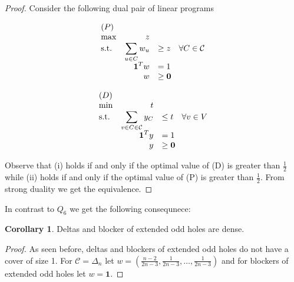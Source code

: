\documentclass[a4paper, 12pt, twoside=false]{scrbook}
\theoremstyle{definition}
\newtheorem{corollary}{Corollary}
\begin{document}
\begin{proof}
    Consider the following dual pair of linear programs
    \newline
    \newline
    \begin{minipage}{.5\linewidth}
        \begin{equation*}
            \begin{array}{l@{\quad} r l l}
                (P)\\
                \max          &z   \\
                \mathrm{s.t.}  &\displaystyle\sum\limits_{u\in C} w_u &\geq  z \quad \forall C \in \mathcal{C} \\
                    & \textbf{1}^Tw &=   1 \\
                    &   w &\geq   \textbf{0}
            \end{array}
        \end{equation*}
    \end{minipage}
    \begin{minipage}{.5\linewidth}
        \begin{equation*}
            \begin{array}{l@{\quad} r l l}
                (D)\\
                \min          &t   \\
                \mathrm{s.t.}  &\displaystyle\sum\limits_{v \in C \in \mathcal{C}} y_C &\leq  t \quad \forall v \in V \\
                    & \textbf{1}^Ty &=   1 \\
                    &   y &\geq   \textbf{0}
            \end{array}
        \end{equation*}
    \end{minipage}
    \newline
    \newline
    Observe that (i) holds if and only if the optimal value of (D) is greater than $\frac 12$ while (ii) holds if and only if the optimal value of (P) is greater than $\frac 12$.
    From strong duality we get the equivalence.
\end{proof}

In contrast to $Q_6$ we get the following consequnece:
\begin{corollary}
    Deltas and blocker of extended odd holes are dense.
\end{corollary}

\begin{proof}
    As seen before, deltas and blockers of extended odd holes do not have a cover of size 1.
    For $\mathcal{C}=\Delta_n$ let $w=\left(\frac{n-2}{2n-3}, \frac 1{2n-3}, \ldots, \frac 1{2n-3}\right)$ and for blockers of extended odd holes let $w=\textbf{1}$.
\end{proof}
\end{document}
